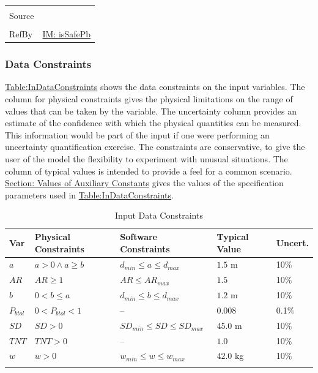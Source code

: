 \documentclass[12pt]{article}
\begin{document}
\begin{minipage}{\textwidth}
\begin{tabular}{>{\raggedright}p{}>{\raggedright\arraybackslash}p{}}
          \\ \midrule \\
          Source & \cite{astm2009}
          \\ \midrule \\
          RefBy & \hyperref[IM:isSafePb]{IM: isSafePb}
          \\ \bottomrule
          \end{tabular}
          \end{minipage}
\subsubsection{Data Constraints}
\label{Sec:DataConstraints}
\hyperref[Table:InDataConstraints]{Table:InDataConstraints} shows the data constraints on the input variables. The column for physical constraints gives the physical limitations on the range of values that can be taken by the variable. The uncertainty column provides an estimate of the confidence with which the physical quantities can be measured. This information would be part of the input if one were performing an uncertainty quantification exercise. The constraints are conservative, to give the user of the model the flexibility to experiment with unusual situations. The column of typical values is intended to provide a feel for a common scenario. \hyperref[Sec:AuxConstants]{Section: Values of Auxiliary Constants} gives the values of the specification parameters used in \hyperref[Table:InDataConstraints]{Table:InDataConstraints}.
\begin{longtable}{l l l l l}
\toprule
\textbf{Var} & \textbf{Physical Constraints} & \textbf{Software Constraints} & \textbf{Typical Value} & \textbf{Uncert.}
\\
\midrule
\endhead
$a$ & $a>0\land{}a\geq{}b$ & ${d_{min}}\leq{}a\leq{}{d_{max}}$ & $1.5$ m & 10$\%$
\\
$AR$ & $AR\geq{}1$ & $AR\leq{}{AR_{max}}$ & $1.5$ & 10$\%$
\\
$b$ & $0<b\leq{}a$ & ${d_{min}}\leq{}b\leq{}{d_{max}}$ & $1.2$ m & 10$\%$
\\
${P_{btol}}$ & $0<{P_{btol}}<1$ & -- & $0.008$ & 0.1$\%$
\\
$SD$ & $SD>0$ & ${SD_{min}}\leq{}SD\leq{}{SD_{max}}$ & $45.0$ m & 10$\%$
\\
$TNT$ & $TNT>0$ & -- & $1.0$ & 10$\%$
\\
$w$ & $w>0$ & ${w_{min}}\leq{}w\leq{}{w_{max}}$ & $42.0$ kg & 10$\%$
\\
\bottomrule
\caption{Input Data Constraints}
\label{Table:InDataConstraints}
\end{longtable}
\end{document}

